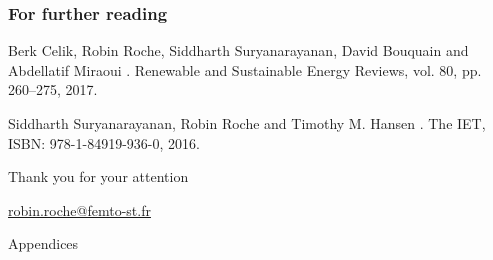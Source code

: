\documentclass[9pt]{beamer}
\begin{document}

\begin{frame}[allowframebreaks]
\frametitle{For further reading}

\footnotesize

\begin{thebibliography}{bib}

Berk Celik, Robin Roche, Siddharth Suryanarayanan, David Bouquain and Abdellatif Miraoui
.
\newblock Renewable and Sustainable Energy Reviews, vol. 80, pp. 260--275, 2017.

Siddharth Suryanarayanan, Robin Roche and Timothy M. Hansen
.
\newblock The IET, ISBN: 978-1-84919-936-0, 2016.

\end{thebibliography}
\end{frame}



\begin{frame}[plain]

\begin{center}
\Huge Thank you for your attention

\vspace*{1em}
\normalsize \url{robin.roche@femto-st.fr}

\end{center}

\end{frame}


\appendix\addtocounter{part}{-1}



\begin{frame}[plain]

\vspace*{1.5em}
\begin{center}
\Huge Appendices
\end{center}

\end{frame}

\end{document}
